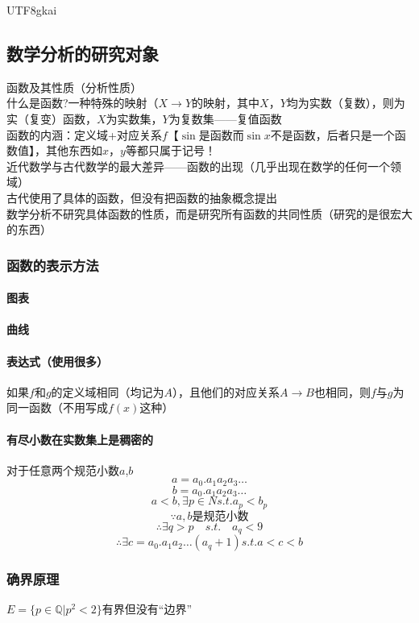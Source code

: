 \documentclass{article}
\begin{document}
\begin{CJK}{UTF8}{gkai}
\subsection{数学分析的研究对象}
函数及其性质（分析性质）\\
什么是函数?一种特殊的映射（$X\to Y$的映射，其中$X$，$Y$均为实数（复数），则为实（复变）函数，$X$为实数集，$Y$为复数集——复值函数\\
函数的内涵：定义域+对应关系$f$【$\sin$是函数而$\sin x$不是函数，后者只是一个函数值】，其他东西如$x$，$y$等都只属于记号！\\
近代数学与古代数学的最大差异——函数的出现（几乎出现在数学的任何一个领域）\\
古代使用了具体的函数，但没有把函数的抽象概念提出\\
数学分析不研究具体函数的性质，而是研究所有函数的共同性质（研究的是很宏大的东西）\\
\subsubsection{函数的表示方法}
\paragraph{图表\\}
\paragraph{曲线\\}
\paragraph{表达式（使用很多）\\}
如果$f$和$g$的定义域相同（均记为$A$），且他们的对应关系$A\rightarrow B$也相同，则$f$与$g$为同一函数（不用写成$f(x)$这种）
\paragraph{有尽小数在实数集上是稠密的\\}
对于任意两个规范小数$a$,$b$
\[a=a_0. a_1 a_2 a_3\dots\]
\[b=a_0. a_1 a_2 a_3\dots\]
\[a<b,\exists p \in {N} s.t. a_p<b_p\]
\[\because a,b\text{是规范小数} \]
\[\therefore  \exists q>p \quad  s.t.\quad a_q<9\]
\[\therefore \exists c=a_0. a_1 a_2 \dots (a_q+1) s.t. a<c<b\]
\subsubsection{确界原理}
$E=\{p\in \mathbb{Q}  |p^2<2\}$有界但没有“边界”\\


\end{CJK}
\end{document}
